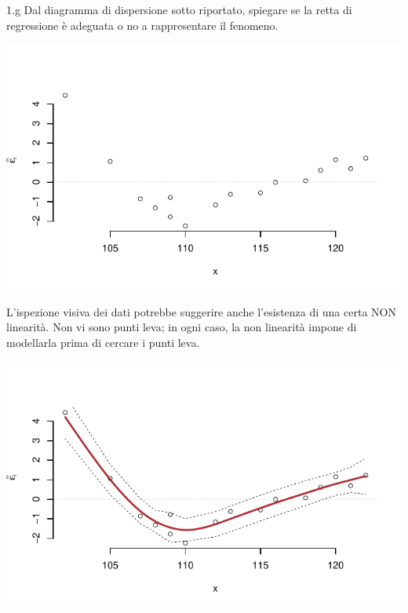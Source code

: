 \documentclass[
  11pt,
]{book}
\theoremstyle{mytheoremstyle}
\theoremstyle{mydefstyle}
\newenvironment{sol}
  {
  \begin{tcolorbox}[enhanced,breakable,arc=0.1mm,boxrule=1pt,colback=white,colframe=iblue,
  title=\bf \fontfamily{lmss}\selectfont \hspace{.5 cm} Soluzione,drop fuzzy shadow]

}{
\end{tcolorbox}
  }
\begin{document}
1.g Dal diagramma di dispersione sotto riportato,
spiegare se la retta di regressione è adeguata o no a
rappresentare il fenomeno.

\begin{center}\includegraphics{Esami_passati_con_soluzioni_files/figure-latex/06-regr-50-1} \end{center}

\begin{sol}

L'ispezione visiva dei dati potrebbe suggerire anche l'esistenza
di una certa NON linearità.
Non vi sono punti leva; in ogni caso, la non linearità impone
di modellarla prima di cercare i punti leva.

\begin{center}\includegraphics{Esami_passati_con_soluzioni_files/figure-latex/06-regr-51-1} \end{center}

\end{sol}
\end{document}
